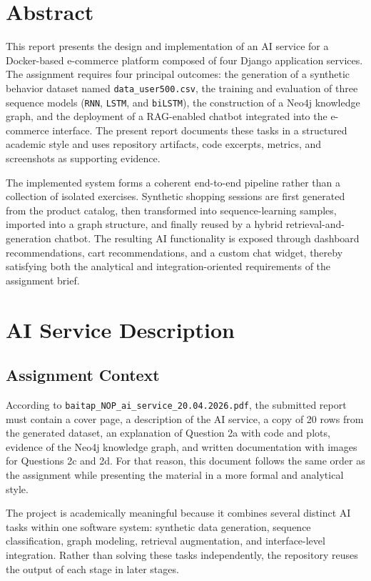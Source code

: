 \documentclass[12pt,a4paper]{article}
\begin{document}
\tableofcontents
\clearpage
{}

\section{Abstract}
This report presents the design and implementation of an AI service for a Docker-based e-commerce platform composed of four Django application services. The assignment requires four principal outcomes: the generation of a synthetic behavior dataset named \texttt{data\_user500.csv}, the training and evaluation of three sequence models (\texttt{RNN}, \texttt{LSTM}, and \texttt{biLSTM}), the construction of a Neo4j knowledge graph, and the deployment of a RAG-enabled chatbot integrated into the e-commerce interface. The present report documents these tasks in a structured academic style and uses repository artifacts, code excerpts, metrics, and screenshots as supporting evidence.

The implemented system forms a coherent end-to-end pipeline rather than a collection of isolated exercises. Synthetic shopping sessions are first generated from the product catalog, then transformed into sequence-learning samples, imported into a graph structure, and finally reused by a hybrid retrieval-and-generation chatbot. The resulting AI functionality is exposed through dashboard recommendations, cart recommendations, and a custom chat widget, thereby satisfying both the analytical and integration-oriented requirements of the assignment brief.

\section{AI Service Description}

\subsection{Assignment Context}
According to \texttt{baitap\_NOP\_ai\_service\_20.04.2026.pdf}, the submitted report must contain a cover page, a description of the AI service, a copy of 20 rows from the generated dataset, an explanation of Question 2a with code and plots, evidence of the Neo4j knowledge graph, and written documentation with images for Questions 2c and 2d. For that reason, this document follows the same order as the assignment while presenting the material in a more formal and analytical style.

The project is academically meaningful because it combines several distinct AI tasks within one software system: synthetic data generation, sequence classification, graph modeling, retrieval augmentation, and interface-level integration. Rather than solving these tasks independently, the repository reuses the output of each stage in later stages.
\end{document}
